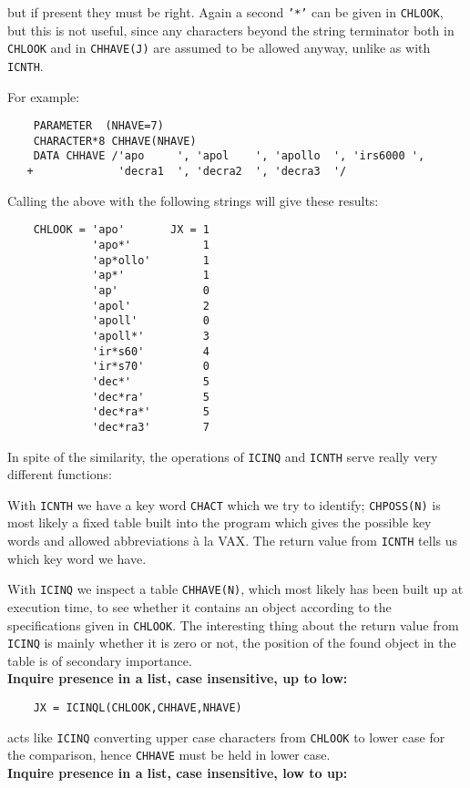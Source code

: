 but if present they must be right.
Again a second {\tt '*'} can be given in {\tt CHLOOK},
but this is not useful, since any characters beyond the
string terminator both in {\tt CHLOOK} and in {\tt CHHAVE(J)}
are assumed to be allowed anyway, unlike as with {\tt ICNTH}.
\par
For example:
\begin{verbatim}
    PARAMETER  (NHAVE=7)
    CHARACTER*8 CHHAVE(NHAVE)
    DATA CHHAVE /'apo     ', 'apol    ', 'apollo  ', 'irs6000 ',
   +             'decra1  ', 'decra2  ', 'decra3  '/
\end{verbatim}
Calling the above with the following strings will give these results:
\begin{verbatim}
    CHLOOK = 'apo'       JX = 1
             'apo*'           1
             'ap*ollo'        1
             'ap*'            1
             'ap'             0
             'apol'           2
             'apoll'          0
             'apoll*'         3
             'ir*s60'         4
             'ir*s70'         0
             'dec*'           5
             'dec*ra'         5
             'dec*ra*'        5
             'dec*ra3'        7
\end{verbatim}
In spite of the similarity, the operations of {\tt ICINQ}
and {\tt ICNTH} serve really very different functions:
\par
With {\tt ICNTH} we have a key word {\tt CHACT} which we
try to identify; {\tt CHPOSS(N)} is most likely a fixed
table built into the program which gives the possible
key words and allowed abbreviations \`a la VAX.
The return value from {\tt ICNTH} tells us which key word  we have.
\par
With {\tt ICINQ} we inspect a table {\tt CHHAVE(N)}, which
most likely has been built up at execution time, to see
whether it contains an object according to the specifications
given in {\tt CHLOOK}.
The interesting thing about the return value from {\tt ICINQ}
is mainly whether it is zero or not, the position of the
found object in the table is of secondary importance.\\[2mm]
{\bf Inquire presence in a list, case insensitive, up to low:}
\begin{verbatim}
    JX = ICINQL(CHLOOK,CHHAVE,NHAVE)
\end{verbatim}
acts like {\tt ICINQ} converting upper case characters from {\tt CHLOOK}
to lower case for the comparison, hence {\tt CHHAVE} must be held
in lower case. \\[2mm]
\newpage
{\bf Inquire presence in a list, case insensitive, low to up:}
